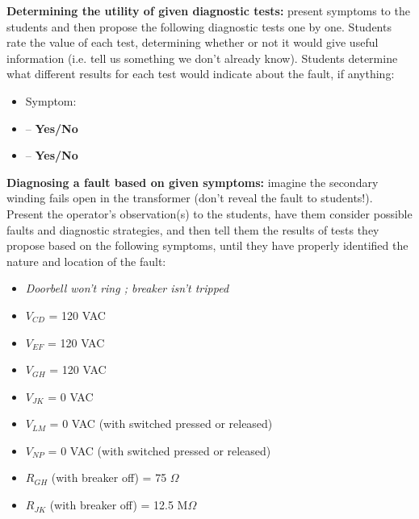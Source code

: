 \vskip 10pt


\noindent
{\bf Determining the utility of given diagnostic tests:} present symptoms to the students and then propose the following diagnostic tests one by one.  Students rate the value of each test, determining whether or not it would give useful information (i.e. tell us something we don't already know).  Students determine what different results for each test would indicate about the fault, if anything:

\begin{itemize}
\item{} Symptom: {\it }
\item{}  -- {\bf Yes/No}
\item{}  -- {\bf Yes/No}
\end{itemize}


\vskip 10pt


\noindent
{\bf Diagnosing a fault based on given symptoms:} imagine the secondary winding fails open in the transformer (don't reveal the fault to students!).  Present the operator's observation(s) to the students, have them consider possible faults and diagnostic strategies, and then tell them the results of tests they propose based on the following symptoms, until they have properly identified the nature and location of the fault:

\begin{itemize}
\item{} {\it Doorbell won't ring ; breaker isn't tripped}
\item{} $V_{CD}$ = 120 VAC
\item{} $V_{EF}$ = 120 VAC
\item{} $V_{GH}$ = 120 VAC
\item{} $V_{JK}$ = 0 VAC
\item{} $V_{LM}$ = 0 VAC (with switched pressed or released)
\item{} $V_{NP}$ = 0 VAC (with switched pressed or released)
\item{} $R_{GH}$ (with breaker off) = 75 $\Omega$
\item{} $R_{JK}$ (with breaker off) = 12.5 M$\Omega$
\end{itemize}




